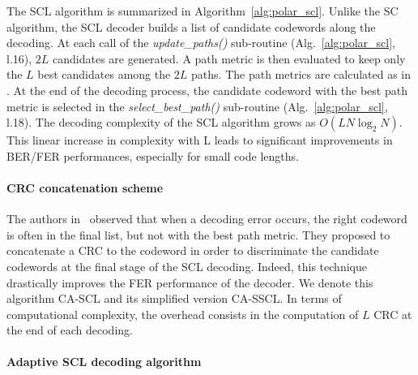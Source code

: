 The SCL algorithm is summarized in Algorithm~\ref{alg:polar_scl}. Unlike the SC
algorithm, the SCL decoder builds a list of candidate codewords along the
decoding. At each call of the \textit{update\_paths()} sub-routine
(Alg.~\ref{alg:polar_scl}, l.16), $2L$ candidates are generated. A path metric
is then evaluated to keep only the $L$ best candidates among the $2L$ paths. The
path metrics are calculated as in \cite{Balatsoukas-Stimming2015}. At the end of
the decoding process, the candidate codeword with the best path metric is
selected in the \textit{select\_best\_path()} sub-routine
(Alg.~\ref{alg:polar_scl}, l.18). The decoding complexity of the SCL algorithm
grows as $O(LN\log_2N)$. This linear increase in complexity with L leads to
significant improvements in BER/FER performances, especially for small code
lengths.

\paragraph{CRC concatenation scheme}

The authors in~\cite{Tal2011} observed that when a decoding error occurs, the
right codeword is often in the final list, but not with the best path metric.
They proposed to concatenate a CRC to the codeword in order to discriminate the
candidate codewords at the final stage of the SCL decoding. Indeed, this
technique drastically improves the FER performance of the decoder. We denote
this algorithm CA-SCL and its simplified version CA-SSCL. In terms of
computational complexity, the overhead consists in the computation of $L$ CRC at
the end of each decoding.

\paragraph{Adaptive SCL decoding algorithm}

